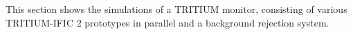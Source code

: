 This section shows the simulations of a TRITIUM monitor, consisting of various TRITIUM-IFIC 2 prototypes in parallel and a background rejection system.